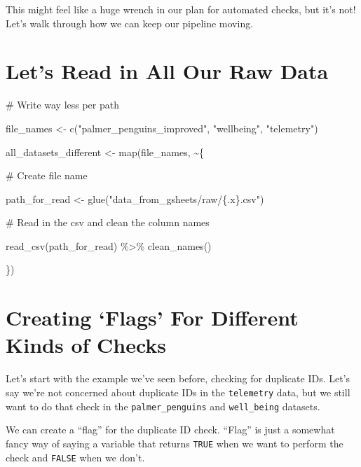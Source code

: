 \documentclass[
  letterpaper,
  DIV=11,
  numbers=noendperiod]{scrreprt}
\newenvironment{Shaded}{\begin{snugshade}}{\end{snugshade}}
\newcommand{\CommentTok}[1]{\textcolor[rgb]{0.37,0.37,0.37}{#1}}
\newcommand{\FunctionTok}[1]{\textcolor[rgb]{0.28,0.35,0.67}{#1}}
\newcommand{\NormalTok}[1]{\textcolor[rgb]{0.00,0.23,0.31}{#1}}
\newcommand{\OtherTok}[1]{\textcolor[rgb]{0.00,0.23,0.31}{#1}}
\newcommand{\SpecialCharTok}[1]{\textcolor[rgb]{0.37,0.37,0.37}{#1}}
\newcommand{\StringTok}[1]{\textcolor[rgb]{0.13,0.47,0.30}{#1}}
\begin{document}
This might feel like a huge wrench in our plan for automated checks, but
it's not! Let's walk through how we can keep our pipeline moving.

\hypertarget{lets-read-in-all-our-raw-data}{%
\section{Let's Read in All Our Raw
Data}\label{lets-read-in-all-our-raw-data}}

\begin{Shaded}
\begin{Highlighting}[]
\CommentTok{\# Write way less per path}

\NormalTok{file\_names }\OtherTok{\textless{}{-}} \FunctionTok{c}\NormalTok{(}\StringTok{"palmer\_penguins\_improved"}\NormalTok{,}
                \StringTok{"wellbeing"}\NormalTok{,}
                \StringTok{"telemetry"}\NormalTok{)}

\NormalTok{all\_datasets\_different }\OtherTok{\textless{}{-}} \FunctionTok{map}\NormalTok{(file\_names, }\SpecialCharTok{\textasciitilde{}}\NormalTok{\{}
  
  \CommentTok{\# Create file name}
  
\NormalTok{  path\_for\_read }\OtherTok{\textless{}{-}} \FunctionTok{glue}\NormalTok{(}\StringTok{"data\_from\_gsheets/raw/\{.x\}.csv"}\NormalTok{)}
  
  \CommentTok{\# Read in the csv and clean the column names}
  
  \FunctionTok{read\_csv}\NormalTok{(path\_for\_read) }\SpecialCharTok{\%\textgreater{}\%}
    \FunctionTok{clean\_names}\NormalTok{()}
  
\NormalTok{\})}
\end{Highlighting}
\end{Shaded}

\hypertarget{creating-flags-for-different-kinds-of-checks}{%
\section{Creating `Flags' For Different Kinds of
Checks}\label{creating-flags-for-different-kinds-of-checks}}

Let's start with the example we've seen before, checking for duplicate
IDs. Let's say we're not concerned about duplicate IDs in the
\texttt{telemetry} data, but we still want to do that check in the
\texttt{palmer\_penguins} and \texttt{well\_being} datasets.

We can create a ``flag'' for the duplicate ID check. ``Flag'' is just a
somewhat fancy way of saying a variable that returns \texttt{TRUE} when
we want to perform the check and \texttt{FALSE} when we don't.
\end{document}
